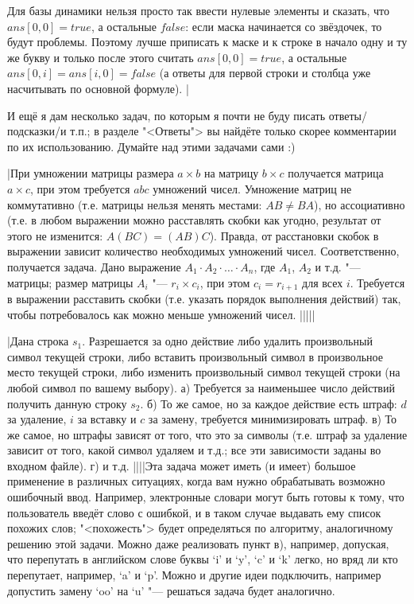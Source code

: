 Для базы динамики нельзя просто так ввести нулевые элементы и сказать, что $ans[0,0]=true$, а остальные $false$: если маска начинается со звёздочек, то будут проблемы. Поэтому лучше приписать к маске и к строке в начало одну и ту же букву и только после этого считать $ans[0,0]=true$, а остальные $ans[0,i]=ans[i,0]=false$ (а ответы для первой строки и столбца уже насчитывать по основной формуле).
|

\vspace{0.5cm}

И ещё я дам несколько задач, по которым я почти не буду писать ответы\slash подсказки\slash и т.п.;
в разделе "<Ответы"> вы найдёте только скорее комментарии по их использованию.
Думайте над этими задачами сами :)

\task|При умножении матрицы размера $a\times b$ 
на матрицу $b\times c$ получается матрица $a\times c$, при этом требуется $abc$ умножений чисел. 
Умножение матриц не коммутативно (т.е. матрицы нельзя менять местами: $AB\neq BA$), но ассоциативно 
(т.е. в любом выражении можно расставлять скобки как угодно, результат от этого не изменится: 
$A(BC)=(AB)C$). Правда, от расстановки скобок в выражении зависит количество необходимых умножений чисел.
Соответственно, получается задача. Дано выражение $A_1\cdot 
A_2\cdot\ldots\cdot A_n$, где $A_1$, $A_2$ и т.д. "--- матрицы; размер матрицы $A_i$ "--- 
$r_i\times c_i$, при этом $c_i=r_{i+1}$ для всех $i$. Требуется в выражении расставить скобки (т.е. 
указать порядок выполнения действий) так, чтобы потребовалось как можно меньше умножений чисел.
|||||

\task|Дана строка $s_1$. Разрешается за одно действие либо удалить произвольный символ текущей строки, 
либо вставить произвольный символ в произвольное место текущей строки, либо изменить произвольный 
символ текущей строки (на любой символ по вашему выбору). а) Требуется за наименьшее число действий 
получить данную строку $s_2$. б) То же самое, но за каждое действие есть штраф: $d$ за удаление, $i$ 
за вставку и $c$ за замену, требуется минимизировать штраф. в) То же самое, но штрафы зависят от 
того, что это за символы (т.е. штраф за удаление зависит от того, какой символ удаляем и т.д.; все 
эти зависимости заданы во входном файле). г) и т.д.
||||Эта задача может иметь (и имеет) большое применение в различных ситуациях, когда вам нужно 
обрабатывать возможно ошибочный ввод. Например, электронные словари могут быть готовы к тому, что 
пользователь введёт слово с ошибкой, и в таком случае выдавать ему список похожих слов; 
"<похожесть"> будет определяться по алгоритму, аналогичному решению этой задачи. Можно даже 
реализовать пункт в), например, допуская, что перепутать в английском слове буквы `i' и `y', `c' и `k' легко, 
но вряд ли кто перепутает, например, `a' и `p'. Можно и другие идеи подключить, например допустить 
замену `oo' на `u' "--- решаться задача будет аналогично.


